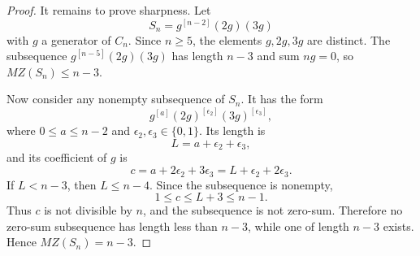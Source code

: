 \documentclass[10pt,a4paper]{amsart}
\begin{document}
\begin{proof}
It remains to prove sharpness.  Let
\[
  S_n=g^{[n-2]}(2g)(3g)
\]
with $g$ a generator of $C_n$.  Since $n\ge 5$, the elements $g,2g,3g$ are distinct.  The subsequence $g^{[n-5]}(2g)(3g)$ has length $n-3$ and sum $ng=0$, so $MZ(S_n)\le n-3$.

Now consider any nonempty subsequence of $S_n$.  It has the form
\[
  g^{[a]}(2g)^{[\epsilon_2]}(3g)^{[\epsilon_3]},
\]
where $0\le a\le n-2$ and $\epsilon_2,\epsilon_3\in\{0,1\}$.  Its length is
\[
  L=a+\epsilon_2+\epsilon_3,
\]
and its coefficient of $g$ is
\[
  c=a+2\epsilon_2+3\epsilon_3=L+\epsilon_2+2\epsilon_3.
\]
If $L<n-3$, then $L\le n-4$.  Since the subsequence is nonempty,
\[
  1\le c\le L+3\le n-1.
\]
Thus $c$ is not divisible by $n$, and the subsequence is not zero-sum.  Therefore no zero-sum subsequence has length less than $n-3$, while one of length $n-3$ exists.  Hence $MZ(S_n)=n-3$.
\end{proof}
\end{document}
